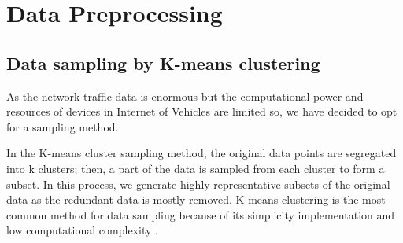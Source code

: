 


\section{Data Preprocessing}

\subsection{Data sampling by K-means clustering}
{

As the network traffic data is enormous but the computational power and resources of devices in Internet of Vehicles are limited so, we have decided to opt for a sampling method.

\par In the K-means cluster sampling method, the original data points are segregated into k clusters; then, a part of the data is sampled from each cluster to form a subset.
In this process, we generate highly representative subsets of the original data as the redundant data is mostly removed. K-means clustering is the most common method for data sampling because of its simplicity implementation and low computational complexity \cite{na2010research}.
}
 



